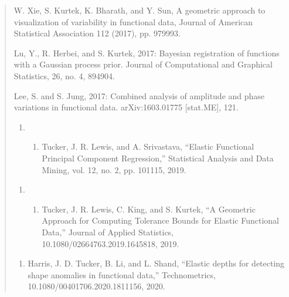 \documentclass[letterpaper,10pt,english]{sphinxmanual}
\begin{document}
\begin{quote}
W. Xie, S. Kurtek, K. Bharath, and Y. Sun, A geometric approach to visualization
of variability in functional data, Journal of American Statistical Association 112
(2017), pp. 979\sphinxhyphen{}993.

Lu, Y., R. Herbei, and S. Kurtek, 2017: Bayesian registration of functions with a Gaussian process prior. Journal of
Computational and Graphical Statistics, 26, no. 4, 894\textendash{}904.

Lee, S. and S. Jung, 2017: Combined analysis of amplitude and phase variations in functional data. arXiv:1603.01775 {[}stat.ME{]}, 1\textendash{}21.
\begin{enumerate}
%
\setcounter{enumi}{9}
\item {} \begin{enumerate}
%
\setcounter{enumii}{3}
\item {} 
Tucker, J. R. Lewis, and A. Srivastava, “Elastic Functional Principal Component Regression,” Statistical Analysis and Data Mining, vol. 12, no. 2, pp. 101\sphinxhyphen{}115, 2019.

\end{enumerate}

\end{enumerate}
\begin{enumerate}
%
\setcounter{enumi}{9}
\item {} \begin{enumerate}
%
\setcounter{enumii}{3}
\item {} 
Tucker, J. R. Lewis, C. King, and S. Kurtek, “A Geometric Approach for Computing Tolerance Bounds for Elastic Functional Data,” Journal of Applied Statistics, 10.1080/02664763.2019.1645818, 2019.

\end{enumerate}

\end{enumerate}
\begin{enumerate}
%
\setcounter{enumi}{19}
\item {} 
Harris, J. D. Tucker, B. Li, and L. Shand, “Elastic depths for detecting shape anomalies in functional data,” Technometrics, 10.1080/00401706.2020.1811156, 2020.

\end{enumerate}
\end{quote}
\end{document}

